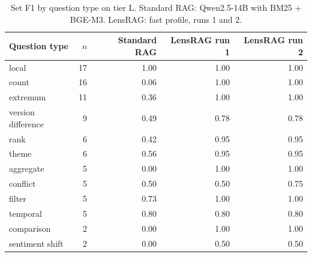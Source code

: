 \documentclass[11pt,letterpaper,oneside]{report}
\begin{document}
\begin{table}[htbp]
\centering\small
\caption{Set F1 by question type on tier L. Standard RAG: Qwen2.5-14B with
BM25 + BGE-M3. LensRAG: fast profile, runs 1 and 2.}
\label{tab:types}
\begin{tabular}{@{}lrrrr@{}}
\toprule
Question type & $n$ & Standard RAG & LensRAG run 1 & LensRAG run 2 \\
\midrule
local & 17 & 1.00 & 1.00 & 1.00 \\
count & 16 & 0.06 & 1.00 & 1.00 \\
extremum & 11 & 0.36 & 1.00 & 1.00 \\
version difference & 9 & 0.49 & 0.78 & 0.78 \\
rank & 6 & 0.42 & 0.95 & 0.95 \\
theme & 6 & 0.56 & 0.95 & 0.95 \\
aggregate & 5 & 0.00 & 1.00 & 1.00 \\
conflict & 5 & 0.50 & 0.50 & 0.75 \\
filter & 5 & 0.73 & 1.00 & 1.00 \\
temporal & 5 & 0.80 & 0.80 & 0.80 \\
comparison & 2 & 0.00 & 1.00 & 1.00 \\
sentiment shift & 2 & 0.00 & 0.50 & 0.50 \\
\bottomrule
\end{tabular}
\end{table}
\end{document}
